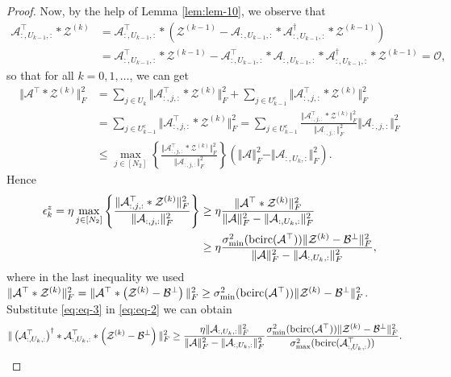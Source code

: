 \documentclass[11pt]{article}
\def\fm#1{\mathcal{#1}}
\def \a#1{\fm A_{:, #1, :}}
\begin{document}
\begin{proof}
Now,  by the help of Lemma \ref{lem:lem-10}, we observe that
\begin{align*}
    \a{U_{k-1}}^\top *\fm Z^{(k)} & = \a{U_{k-1}}^\top *\left( \fm Z^{(k-1)} - \a{U_{k-1}}*\a{U_{k-1}}^\dagger * \fm Z^{(k-1)} \right)\\
    & =  \a{U_{k-1}}^\top*\fm Z^{(k-1)} - \a{U_{k-1}}^\top *\a{U_{k-1}} * \a{U_{k-1}}^\dagger* \fm Z^{(k-1)} = \fm O,
\end{align*}
so that for all $k=0, 1, \ldots$, we can get
\begin{align*}
    \Vert \fm A^\top * \fm Z^{(k)}\Vert_F^2  & = \sum_{j \in U_k} \Vert \a j ^\top  * \fm Z^{(k)} \Vert_F^2 + \sum_{j\in U^c_{k-1}}\Vert \a j ^\top  * \fm Z^{(k)} \Vert_F^2 \\
    &=  \sum_{j\in U^c_{k-1}}\Vert \a j ^\top  * \fm Z^{(k)} \Vert_F^2  =  \sum_{j\in U^c_{k-1}} \frac{ \Vert \a j ^\top  * \fm Z^{(k)} \Vert_F^2}{ \Vert \a j \Vert_F^2}\Vert \a j \Vert_F^2\\
    & \leq \max_{j \in [N_2]}\left\{  \frac{ \Vert \a j ^\top  * \fm Z^{(k)} \Vert_F^2}{ \Vert \a j \Vert_F^2} \right\}\left(\Vert \fm A \Vert_F^2 - \Vert \a{U_k} \Vert_F^2 \right).
\end{align*}
Hence
\begin{align}
    \epsilon^z_k = \eta \max_{j \in [N_2]}\left\{  \frac{ \Vert \a j ^\top  * \fm Z^{(k)} \Vert_F^2}{ \Vert \a j \Vert_F^2} \right\} &\geq \eta \frac{ \Vert \fm A^\top * \fm Z^{(k)}\Vert_F^2}{\Vert \fm A \Vert_F^2 - \Vert \a{U_k} \Vert_F^2} \notag\\
    & \geq \eta\frac{ \sigma_{\min}^2(\bcirc(\fm A^\top)) \Vert \fm Z^{(k)}-\fm B^\perp \Vert_F^2}{\Vert \fm A \Vert_F^2 - \Vert \a{U_k} \Vert_F^2},  \label{eq:eq-3}
\end{align}
where in the last inequality we used $ \Vert \fm A^\top *  \fm Z^{(k)}\Vert_F^2 =  \Vert \fm A^\top * \left( \fm Z^{(k)} - \fm B^\perp \right)\Vert_F^2 \geq \sigma_{\min}^2(\bcirc(\fm A^\top)) \Vert \fm Z^{(k)}-\fm B^\perp \Vert_F^2 $.\\
Substitute \eqref{eq:eq-3} in \eqref{eq:eq-2} we can obtain
\begin{align}
     \Vert \left(\a{U_k}^\top \right)^\dagger * \a{U_k}^\top *\left(\fm Z^{(k)}-\fm B^\perp \right) \Vert_F^2 & \geq \frac{\eta \Vert \a{U_k} \Vert_F^2}{\Vert \fm A \Vert_F^2 - \Vert \a{U_k} \Vert_F^2} \frac{\sigma_{\min}^2(\bcirc(\fm A^\top)) \Vert \fm Z^{(k)}-\fm B^\perp \Vert_F^2}{\sigma_{\max}^2(\bcirc(\a{U_k}^\top))}. \label{eq:eq-4}
\end{align}

\end{proof}
\end{document}
